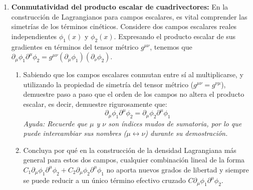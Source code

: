 \begin{enumerate}

    \item \textbf{Conmutatividad del producto escalar de cuadrivectores:} 
    En la construcción de Lagrangianos para campos escalares, es vital comprender las simetrías de los términos cinéticos. Considere dos campos escalares reales independientes $\phi_1(x)$ y $\phi_2(x)$. Expresando el producto escalar de sus gradientes en términos del tensor métrico $g^{\mu\nu}$, tenemos que $\partial_\mu \phi_1 \partial^\mu \phi_2 = g^{\mu\nu}(\partial_\mu \phi_1)(\partial_\nu \phi_2)$.
    \begin{enumerate}
        \item Sabiendo que los campos escalares conmutan entre sí al multiplicarse, y utilizando la propiedad de simetría del tensor métrico ($g^{\mu\nu} = g^{\nu\mu}$), demuestre paso a paso que el orden de los campos no altera el producto escalar, es decir, demuestre rigurosamente que:
        \begin{equation*}
            \partial_\mu \phi_1 \partial^\mu \phi_2 = \partial_\mu \phi_2 \partial^\mu \phi_1
        \end{equation*}
        \textit{Ayuda: Recuerde que $\mu$ y $\nu$ son índices mudos de sumatoria, por lo que puede intercambiar sus nombres ($\mu \leftrightarrow \nu$) durante su demostración.}
        \item Concluya por qué en la construcción de la densidad Lagrangiana más general para estos dos campos, cualquier combinación lineal de la forma $C_1 \partial_\mu \phi_1 \partial^\mu \phi_2 + C_2 \partial_\mu \phi_2 \partial^\mu \phi_1$ no aporta nuevos grados de libertad y siempre se puede reducir a un único término efectivo cruzado $C \partial_\mu \phi_1 \partial^\mu \phi_2$.
    \end{enumerate}


\end{enumerate}
